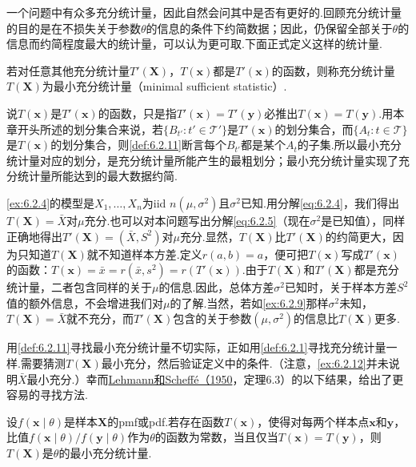 一个问题中有众多充分统计量，因此自然会问其中是否有更好的.回顾充分统计量的目的是在不损失关于参数$\theta$的信息的条件下约简数据；因此，仍保留全部关于$\theta$的信息而约简程度最大的统计量，可以认为更可取.下面正式定义这样的统计量.
\begin{definition}\label{def:6.2.11}
若对任意其他充分统计量$T'(\boldsymbol X)$，$T(\boldsymbol x)$都是$T'(\boldsymbol x)$的函数，则称充分统计量$T(\boldsymbol X)$为最小充分统计量（minimal sufficient statistic）.
\end{definition}
说$T(\boldsymbol x)$是$T'(\boldsymbol x)$的函数，只是指$T'(\boldsymbol x)=T'(\boldsymbol y)$必推出$T(\boldsymbol x)=T(\boldsymbol y)$.用本章开头所述的划分集合来说，若$\{B_{t'}:t'\in\mathcal T'\}$是$T'(\boldsymbol x)$的划分集合，而$\{A_t:t\in\mathcal T\}$是$T(\boldsymbol x)$的划分集合，则\autoref{def:6.2.11}断言每个$B_{t'}$都是某个$A_t$的子集.所以最小充分统计量对应的划分，是充分统计量所能产生的最粗划分；最小充分统计量实现了充分统计量所能达到的最大数据约简.
\begin{example}[两个正态充分统计量]\label{ex:6.2.12}
\autoref{ex:6.2.4}的模型是$X_1,\ldots,X_n$为iid $n(\mu,\sigma^2)$且$\sigma^2$已知.用分解\eqref{eq:6.2.4}，我们得出$T(\boldsymbol X)=\bar X$对$\mu$充分.也可以对本问题写出分解\eqref{eq:6.2.5}（现在$\sigma^2$是已知值），同样正确地得出$T'(\boldsymbol X)=(\bar X,S^2)$对$\mu$充分.显然，$T(\boldsymbol X)$比$T'(\boldsymbol X)$的约简更大，因为只知道$T(\boldsymbol X)$就不知道样本方差.定义$r(a,b)=a$，便可把$T(\boldsymbol x)$写成$T'(\boldsymbol x)$的函数：$T(\boldsymbol x)=\bar x=r(\bar x,s^2)=r(T'(\boldsymbol x))$.由于$T(\boldsymbol X)$和$T'(\boldsymbol X)$都是充分统计量，二者包含同样的关于$\mu$的信息.因此，总体方差$\sigma^2$已知时，关于样本方差$S^2$值的额外信息，不会增进我们对$\mu$的了解.当然，若如\autoref{ex:6.2.9}那样$\sigma^2$未知，$T(\boldsymbol X)=\bar X$就不充分，而$T'(\boldsymbol X)$包含的关于参数$(\mu,\sigma^2)$的信息比$T(\boldsymbol X)$更多.
\end{example}
用\autoref{def:6.2.11}寻找最小充分统计量不切实际，正如用\autoref{def:6.2.1}寻找充分统计量一样.需要猜测$T(\boldsymbol X)$最小充分，然后验证定义中的条件.（注意，\autoref{ex:6.2.12}并未说明$\bar X$最小充分.）幸而\hyperref[bib:source201]{Lehmann和Scheffé（1950}，定理6.3）的以下结果，给出了更容易的寻找方法.
\begin{theorem}\label{thm:6.2.13}
设$f(\boldsymbol x\mid\theta)$是样本$\boldsymbol X$的pmf或pdf.若存在函数$T(\boldsymbol x)$，使得对每两个样本点$\boldsymbol x$和$\boldsymbol y$，比值$f(\boldsymbol x\mid\theta)/f(\boldsymbol y\mid\theta)$作为$\theta$的函数为常数，当且仅当$T(\boldsymbol x)=T(\boldsymbol y)$，则$T(\boldsymbol X)$是$\theta$的最小充分统计量.
\end{theorem}
